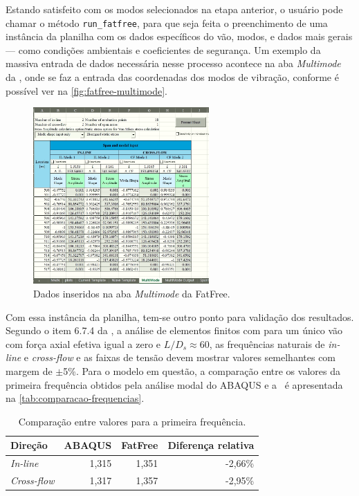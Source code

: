 Estando satisfeito com os modos selecionados na etapa anterior, o usuário pode chamar o método \texttt{run\_fatfree}, para que seja feita o preenchimento de uma instância da planilha com os dados específicos do vão, modos, e dados mais gerais --- como condições ambientais e coeficientes de segurança. Um exemplo da massiva entrada de dados necessária nesse processo acontece na aba \textit{Multimode} da \fatfree, onde se faz a entrada das coordenadas dos modos de vibração, conforme é possível ver na \autoref{fig:fatfree-multimode}.

\begin{figure}[!ht]
	\centering
	\caption{Dados inseridos na aba \textit{Multimode} da FatFree.}\label{fig:fatfree-multimode}
	\includegraphics[width=0.6\textwidth]{imagens/exemplo/fatfree_multimode}
\end{figure}

Com essa instância da planilha, tem-se outro ponto para validação dos resultados.
Segundo o item 6.7.4 da , a análise de elementos finitos com para um único vão com força axial efetiva igual a zero e $L / D_s \approx 60$, as frequências naturais de \textit{in-line} e \textit{cross-flow} e as faixas de tensão devem mostrar valores semelhantes com margem de $\pm$5\%. Para o modelo em questão, a comparação entre os valores da primeira frequência obtidos pela análise modal do ABAQUS e a \fatfree\ é apresentada na \autoref{tab:comparacao-frequencias}.

\begin{table}[!ht]
\renewcommand{\arraystretch}{1.2}
\centering
\caption{Comparação entre valores para a primeira frequência.}\label{tab:comparacao-frequencias}
\begin{tabular}{lrrr}
\toprule
Direção & ABAQUS & FatFree & Diferença relativa\\
\midrule
\textit{In-line}    & 1,315 & 1,351 & -2,66\%\\ %
\textit{Cross-flow} & 1,317 & 1,357 & -2,95\%\\ %
\bottomrule
\end{tabular}
\end{table}

